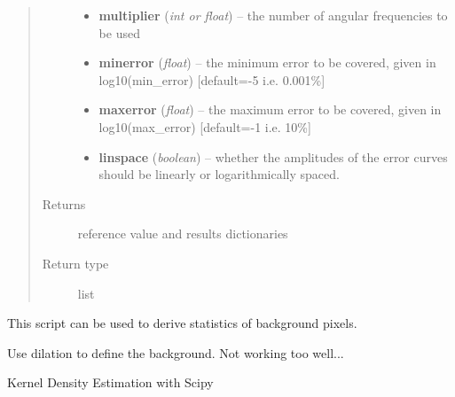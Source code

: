 \documentclass[a4paper,11pt,english]{sphinxmanual}
\begin{document}
\begin{fulllineitems}
\begin{quote}
\begin{description}
\begin{itemize}
\item {} 
\textbf{multiplier} (\emph{int or float}) -- the number of angular frequencies to be used

\item {} 
\textbf{minerror} (\emph{float}) -- the minimum error to be covered, given in log10(min\_error) {[}default=-5 i.e. 0.001\%{]}

\item {} 
\textbf{maxerror} (\emph{float}) -- the maximum error to be covered, given in log10(max\_error) {[}default=-1 i.e. 10\%{]}

\item {} 
\textbf{linspace} (\emph{boolean}) -- whether the amplitudes of the error curves should be linearly or logarithmically spaced.

\end{itemize}

\item[{Returns}] \leavevmode
reference value and results dictionaries

\item[{Return type}] \leavevmode
list

\end{description}\end{quote}

\end{fulllineitems}

\label{reduction:module-analysis.analyseBackground}
This script can be used to derive statistics of background pixels.

\begin{fulllineitems}
\label{reduction:analysis.analyseBackground.dilation}
Use dilation to define the background. Not working too well...

\end{fulllineitems}


\begin{fulllineitems}
\label{reduction:analysis.analyseBackground.kde_scipy}
Kernel Density Estimation with Scipy

\end{fulllineitems}
\end{document}
